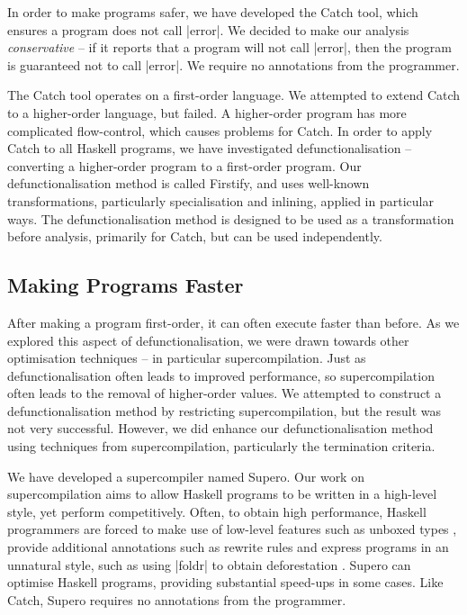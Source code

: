 In order to make programs safer, we have developed the Catch tool, which ensures a program does not call |error|. We decided to make our analysis \textit{conservative} -- if it reports that a program will not call |error|, then the program is guaranteed not to call |error|. We require no annotations from the programmer.

The Catch tool operates on a first-order language. We attempted to extend Catch to a higher-order language, but failed. A higher-order program has more complicated flow-control, which causes problems for Catch. In order to apply Catch to all Haskell programs, we have investigated defunctionalisation -- converting a higher-order program to a first-order program. Our defunctionalisation method is called Firstify, and uses well-known transformations, particularly specialisation and inlining, applied in particular ways. The defunctionalisation method is designed to be used as a transformation before analysis, primarily for Catch, but can be used independently.

\subsection{Making Programs Faster}

After making a program first-order, it can often execute faster than before. As we explored this aspect of defunctionalisation, we were drawn towards other optimisation techniques -- in particular supercompilation. Just as defunctionalisation often leads to improved performance, so supercompilation often leads to the removal of higher-order values. We attempted to construct a defunctionalisation method by restricting supercompilation, but the result was not very successful. However, we did enhance our defunctionalisation method using techniques from supercompilation, particularly the termination criteria.

We have developed a supercompiler named Supero. Our work on supercompilation aims to allow Haskell programs to be written in a high-level style, yet perform competitively. Often, to obtain high performance, Haskell programmers are forced to make use of low-level features such as unboxed types \cite{spj:unboxing}, provide additional annotations such as rewrite rules \cite{spj:rules} and express programs in an unnatural style, such as using |foldr| to obtain deforestation \cite{gill:shortcut_deforestation}. Supero can optimise Haskell programs, providing substantial speed-ups in some cases. Like Catch, Supero requires no annotations from the programmer.


